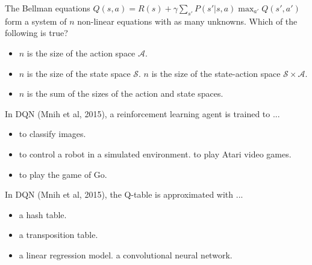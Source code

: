 \documentclass[11pt, a4paper]{article}
\begin{document}
The Bellman equations $Q(s,a) = R(s) + \gamma \sum_{s'} P(s'|s,a) \max_{a'} Q(s',a')$ form a system of $n$ non-linear equations with as many unknowns. Which of the following is true?
\begin{itemize}
    \item $n$ is the size of the action space $\mathcal{A}$.
    \item $n$ is the size of the state space $\mathcal{S}$.
    \solitem $n$ is the size of the state-action space $\mathcal{S} \times \mathcal{A}$. %
    \item $n$ is the sum of the sizes of the action and state spaces.
\end{itemize}
In DQN (Mnih et al, 2015), a reinforcement learning agent is trained to ...
\begin{itemize}
    \item to classify images. 
    \item to control a robot in a simulated environment.
    \solitem to play Atari video games.  %
    \item to play the game of Go.
\end{itemize}
In DQN (Mnih et al, 2015), the Q-table is approximated with ...
\begin{itemize}
    \item a hash table.
    \item a transposition table.
    \item a linear regression model.
    \solitem a convolutional neural network. %
\end{itemize}
\end{document}
